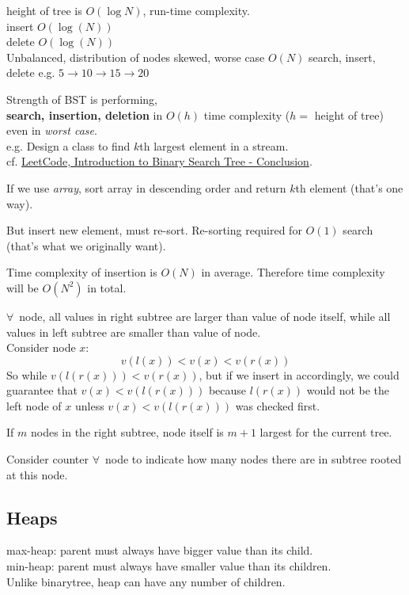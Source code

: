 \documentclass[10pt]{amsart}
\begin{document}
height of tree is $O(\log{N})$, run-time complexity. \\
insert $O(\log{(N)})$ \\
delete $O(\log{(N)})$ \\

Unbalanced, distribution of nodes skewed, worse case $O(N)$ search, insert, delete e.g. $5 \to 10 \to 15 \to 20$

Strength of BST is performing, \\
\textbf{search, insertion, deletion} in $O(h)$ time complexity ($h = $ height of tree) even in \emph{worst case}. \\

e.g. Design a class to find $k$th largest element in a stream. \\

cf. \href{https://leetcode.com/explore/learn/card/introduction-to-data-structure-binary-search-tree/142/conclusion/1009/}{LeetCode, Introduction to Binary Search Tree - Conclusion}. 

If we use \emph{array}, sort array in descending order and return $k$th element (that's one way).  

But insert new element, must re-sort. Re-sorting required for $O(1)$ search (that's what we originally want).

Time complexity of insertion is $O(N)$ in average. Therefore time complexity will be $O(N^2)$ in total.

$\forall \, $ node, all values in right subtree are larger than value of node itself, while all values in left subtree are smaller than value of node. \\
Consider node $x$:
\[
v(l(x)) < v(x) < v(r(x))
\]
So while $v(l(r(x))) < v(r(x))$, but if we insert in accordingly, we could guarantee that $v(x) < v(l(r(x)))$ because $l(r(x))$ would not be the left node of $x$ unless $v(x) < v(l(r(x)))$ was checked first.

If $m$ nodes in the right subtree, node itself is $m+1$ largest for the current tree.

Consider counter $\forall \,$ node to indicate how many nodes there are in subtree rooted at this node.

\subsection{Heaps}

max-heap: parent must always have bigger value than its child. \\
min-heap: parent must always have smaller value than its children. \\
Unlike binarytree, heap can have any number of children. 
\end{document}
